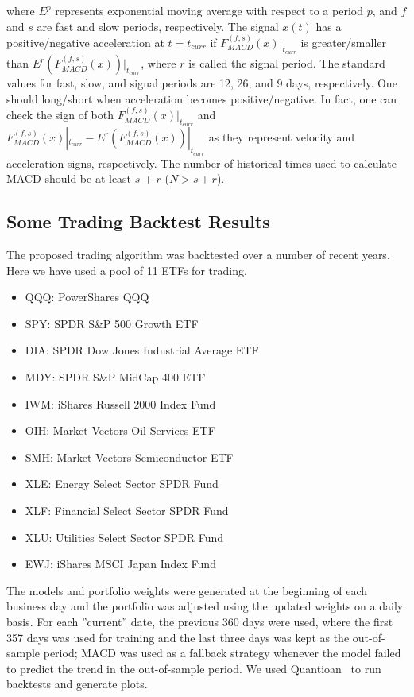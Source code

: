 \documentclass{article}
\begin{document}
where $E^{p}$ represents exponential moving average with respect to a
period $p$, and $f$ and $s$ are fast and slow periods,
respectively. The signal $x(t)$ has a positive/negative acceleration
at $t=t_{curr}$ if $F_{MACD}^{(f,s)}(x)|_{t_{curr}}$ is
greater/smaller than $E^{r}(F_{MACD}^{(f,s)}(x))|_{t_{curr}}$, where
$r$ is called the signal period. The standard values for fast, slow,
and signal periods are 12, 26, and 9 days, respectively. One should
long/short when acceleration becomes positive/negative. In fact, one
can check the sign of both $F_{MACD}^{(f,s)}(x)|_{t_{curr}}$ and
$F_{MACD}^{(f,s)}(x)|_{t_{curr}}-E^{r}(F_{MACD}^{(f,s)}(x))|_{t_{curr}}$
as they represent velocity and acceleration signs, respectively. The
number of historical times used to calculate MACD should be at least
$s$ + $r$ ($N > s + r$).

\subsection{Some Trading Backtest Results}\label{subsection:trading-backtest}

The proposed trading algorithm was backtested over a number of recent
years. Here we have used a pool of 11 ETFs for trading,

\begin{itemize}
    \item[] QQQ: PowerShares QQQ 
    \item[] SPY: SPDR S\&P 500 Growth ETF 
    \item[] DIA: SPDR Dow Jones Industrial Average ETF 
    \item[] MDY: SPDR S\&P MidCap 400 ETF 
    \item[] IWM: iShares Russell 2000 Index Fund 
    \item[] OIH: Market Vectors Oil Services ETF 
    \item[] SMH: Market Vectors Semiconductor ETF 
    \item[] XLE: Energy Select Sector SPDR Fund 
    \item[] XLF: Financial Select Sector SPDR Fund 
    \item[] XLU: Utilities Select Sector SPDR Fund 
    \item[] EWJ: iShares MSCI Japan Index Fund
\end{itemize}

The models and portfolio weights were generated at the beginning of
each business day and the portfolio was adjusted using the updated
weights on a daily basis. For each ''current'' date, the previous 360
days were used, where the first 357 days was used for training and the
last three days was kept as the out-of-sample period; MACD was used as
a fallback strategy whenever the model failed to predict the trend in
the out-of-sample period. We used Quantioan~\cite{ref:quantopian} to
run backtests and generate plots.
\end{document}
